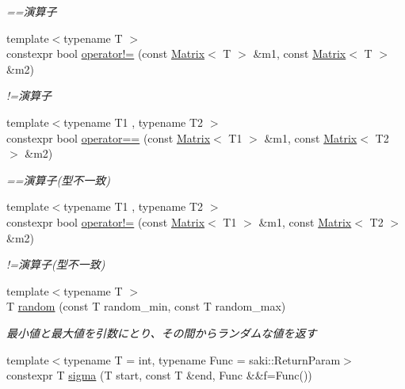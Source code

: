 \begin{DoxyCompactItemize}
\begin{DoxyCompactList}\small\item\em ==演算子 \end{DoxyCompactList}\item 
{\footnotesize template$<$typename T $>$ }\\constexpr bool \mbox{\hyperlink{namespacesaki_a79218f0b5ef57832094c0fb4b74fb8b2}{operator!=}} (const \mbox{\hyperlink{classsaki_1_1_matrix}{Matrix}}$<$ T $>$ \&m1, const \mbox{\hyperlink{classsaki_1_1_matrix}{Matrix}}$<$ T $>$ \&m2)
\begin{DoxyCompactList}\small\item\em !=演算子 \end{DoxyCompactList}\item 
{\footnotesize template$<$typename T1 , typename T2 $>$ }\\constexpr bool \mbox{\hyperlink{namespacesaki_a57ebf9c4b637e0dff3c957a7b4786332}{operator==}} (const \mbox{\hyperlink{classsaki_1_1_matrix}{Matrix}}$<$ T1 $>$ \&m1, const \mbox{\hyperlink{classsaki_1_1_matrix}{Matrix}}$<$ T2 $>$ \&m2)
\begin{DoxyCompactList}\small\item\em ==演算子(型不一致) \end{DoxyCompactList}\item 
{\footnotesize template$<$typename T1 , typename T2 $>$ }\\constexpr bool \mbox{\hyperlink{namespacesaki_afce7efc7fea0dc8cd8bc6a10d231261e}{operator!=}} (const \mbox{\hyperlink{classsaki_1_1_matrix}{Matrix}}$<$ T1 $>$ \&m1, const \mbox{\hyperlink{classsaki_1_1_matrix}{Matrix}}$<$ T2 $>$ \&m2)
\begin{DoxyCompactList}\small\item\em !=演算子(型不一致) \end{DoxyCompactList}\item 
{\footnotesize template$<$typename T $>$ }\\T \mbox{\hyperlink{namespacesaki_a636caf16f2f00cb734cc867646ac233f}{random}} (const T random\+\_\+min, const T random\+\_\+max)
\begin{DoxyCompactList}\small\item\em 最小値と最大値を引数にとり、その間からランダムな値を返す \end{DoxyCompactList}\item 
{\footnotesize template$<$typename T  = int, typename Func  = saki\+::\+Return\+Param$>$ }\\constexpr T \mbox{\hyperlink{namespacesaki_aa5a82a930469f18d700db4d93b59a7e5}{sigma}} (T start, const T \&end, Func \&\&f=Func())

\end{DoxyCompactItemize}
